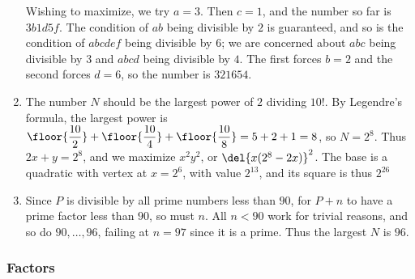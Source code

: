 \documentclass[10pt,paper=letter]{scrartcl}
\begin{document}
\begin{enumerate}
Wishing to maximize, we try $a = 3$. Then $c = 1$, and the number so far is $3b1d5f$. The condition of $ab$ being divisible by $2$ is guaranteed, and so is the condition of $abcdef$ being divisible by $6$; we are concerned about $abc$ being divisible by $3$ and $abcd$ being divisible by $4$. The first forces $b = 2$ and the second forces $d = 6$, so the number is $321654$.

\item The number $N$ should be the largest power of $2$ dividing $10!$. By Legendre's formula, the largest power is $\floor{\dfrac{10}2} + \floor{\dfrac{10}4} + \floor{\dfrac{10}8} = 5 + 2 + 1 = 8$, so $N = 2^8$. Thus $2x + y = 2^8$, and we maximize $x^2y^2$, or $\del{x(2^8-2x)}^2$. The base is a quadratic with vertex at $x = 2^6$, with value $2^{13}$, and its square is thus $2^{26}$

\item Since $P$ is divisible by all prime numbers less than $90$, for $P+n$ to have a prime factor less than $90$, so must $n$. All $n < 90$ work for trivial reasons, and so do $90, \ldots, 96$, failing at $n = 97$ since it is a prime. Thus the largest $N$ is $96$.

\end{enumerate}

\subsubsection*{Factors}
\end{document}
